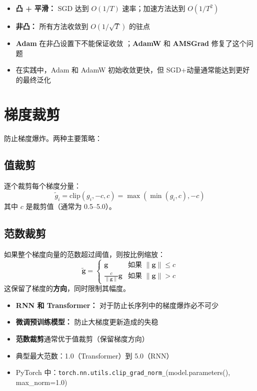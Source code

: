 \begin{properties}[不同优化器的收敛速率]
\begin{itemize}
    \item \textbf{凸 + 平滑：} SGD 达到 $O(1/T)$ 速率；加速方法达到 $O(1/T^2)$
    \item \textbf{非凸：} 所有方法收敛到 $O(1/\sqrt{T})$ 的驻点
    \item \textbf{Adam} 在非凸设置下不能保证收敛 \cite{reddi2018convergence}；\textbf{AdamW} 和 \textbf{AMSGrad} 修复了这个问题
    \item 在实践中，Adam 和 AdamW 初始收敛更快，但 SGD+动量通常能达到更好的最终泛化
\end{itemize}
\end{properties}

\section{梯度裁剪}

防止梯度爆炸。两种主要策略：

\subsection{值裁剪}

逐个裁剪每个梯度分量：
\begin{equation}
\tilde{g}_i = \text{clip}(g_i, -c, c) = \max(\min(g_i, c), -c)
\end{equation}
其中 $c$ 是裁剪值（通常为 0.5--5.0）。

\subsection{范数裁剪}

如果整个梯度向量的范数超过阈值，则按比例缩放：
\begin{equation}
\tilde{\mathbf{g}} = \begin{cases}
\mathbf{g} & \text{如果 } \|\mathbf{g}\| \leq c \\
\frac{c}{\|\mathbf{g}\|} \mathbf{g} & \text{如果 } \|\mathbf{g}\| > c
\end{cases}
\end{equation}
这保留了梯度的\textbf{方向}，同时限制其幅度。

\begin{properties}[何时使用梯度裁剪]
\begin{itemize}
    \item \textbf{RNN 和 Transformer：} 对于防止长序列中的梯度爆炸必不可少
    \item \textbf{微调预训练模型：} 防止大梯度更新造成的失稳
    \item \textbf{范数裁剪}通常优于值裁剪（保留梯度方向）
    \item 典型最大范数：1.0（Transformer）到 5.0（RNN）
    \item PyTorch 中：\texttt{torch.nn.utils.clip\_grad\_norm\_}(model.parameters(), max\_norm=1.0)
\end{itemize}
\end{properties}

